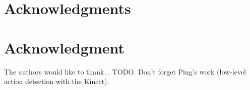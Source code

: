 \documentclass[10pt,journal,letterpaper,compsoc]{IEEEtran}
\begin{document}

%


%


\ifCLASSOPTIONcompsoc
  \section*{Acknowledgments}
\else
  \section*{Acknowledgment}
\fi


The authors would like to thank... TODO.  Don't forget Ping's work (low-level action detection with the Kinect).
\end{document}
